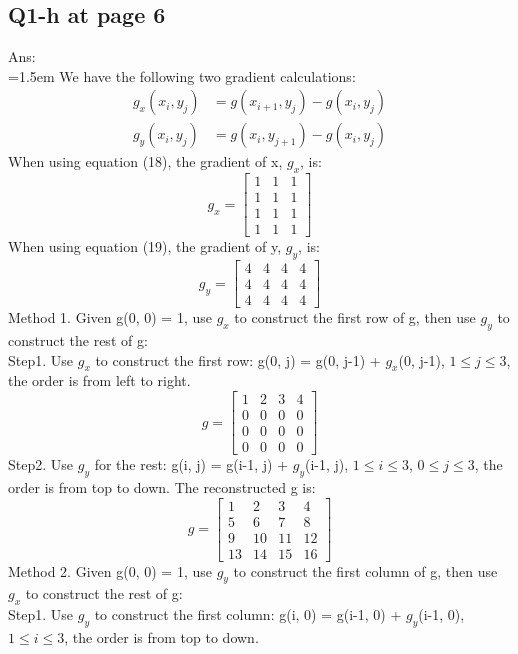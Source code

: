 \documentclass{article}
\begin{document}
	\subsection*{Q1-h at page 6}
	Ans:\\
	\hangindent=1.5em \hspace{1.5em} We have the following two gradient calculations:
	\begin{align}
		g_x(x_i, y_j) &= g(x_{i+1}, y_j) - g(x_i, y_j) \\
		g_y(x_i, y_j) &= g(x_i, y_{j+1}) - g(x_i, y_j)
	\end{align}
	When using equation (18), the gradient of x, $g_x$, is:
	\[
	g_x =
	\begin{bmatrix}
		1 & 1 & 1 \\
		1 & 1 & 1 \\
		1 & 1 & 1 \\
		1 & 1 & 1
	\end{bmatrix}
	\]	
	When using equation (19), the gradient of y, $g_y$, is:
	\[
	g_y =
	\begin{bmatrix}
		4 & 4 & 4 & 4\\
		4 & 4 & 4 & 4 \\
		4 & 4 & 4 & 4 
	\end{bmatrix}
	\]	
	Method 1. Given g(0, 0) = 1, use $g_x$ to construct the first row of g, then use $g_y$ to construct the rest of g: \\
	Step1. Use $g_x$ to construct the first row: g(0, j) = g(0, j-1) + $g_x$(0, j-1), $1\leq j \leq 3$, the order is from left to right.
	\[
	g =
	\begin{bmatrix}
		1 & 2 & 3 & 4 \\
		0 & 0 & 0 & 0 \\
		0 & 0 & 0 & 0 \\
		0 & 0 & 0 & 0
	\end{bmatrix}
	\]
	Step2. Use $g_y$ for the rest: g(i, j) = g(i-1, j) + $g_y$(i-1, j), $1\leq i \leq 3$, $0\leq j \leq 3$, the order is from top to down. The reconstructed g is:
	\[
	g =
	\begin{bmatrix}
		1 & 2 & 3 & 4 \\
		5 & 6 & 7 & 8 \\
		9 & 10 & 11 & 12 \\
		13 & 14 & 15 & 16
	\end{bmatrix}
	\]	
	Method 2. Given g(0, 0) = 1, use $g_y$ to construct the first column of g, then use $g_x$ to construct the rest of g: \\
	Step1. Use $g_y$ to construct the first column: g(i, 0) = g(i-1, 0) + $g_y$(i-1, 0), $1\leq i \leq 3$, the order is from top to down.
\end{document}
